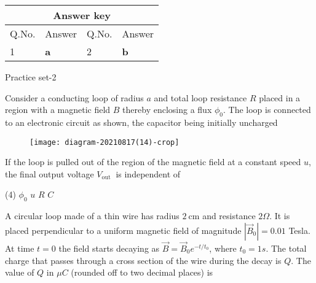\setlength\arrayrulewidth{1pt}
\begin{table}[H]
	\centering
	
	\begin{tabular}{|p{1.5cm}|p{1.5cm}||p{1.5cm}|p{1.5cm}|}
		\hline
		\multicolumn{4}{|c|}{\textbf{Answer key}}\\\hline\hline
		\rowcolor{ocrel}Q.No.&Answer&Q.No.&Answer\\\hline
		1&\textbf{a}&2&\textbf{b}\\\hline
	\end{tabular}
\end{table}
\newpage
\begin{abox}
	Practice set-2
	\end{abox}
\begin{enumerate}
	\begin{minipage}{\textwidth}
		\item Consider a conducting loop of radius $a$ and total loop resistance $R$ placed in a region with a magnetic field $B$ thereby enclosing a flux $\phi_{0}$. The loop is connected to an electronic circuit as shown, the capacitor being initially uncharged\\
		\begin{figure}[H]
			\centering
			\texttt{[image: diagram-20210817(14)-crop]}
		\end{figure}
		If the loop is pulled out of the region of the magnetic field at a constant speed $u$, the final output voltage $V_{\text {out }}$ is independent of
	\end{minipage}
	\begin{tasks}(4)
		\task[\textbf{A.}] $\phi_{0}$
		\task[\textbf{B.}]$u$ 
		\task[\textbf{C.}]$R$
		\task[\textbf{D.}] $C$ 
	\end{tasks}
\begin{minipage}{\textwidth}
	\item A circular loop made of a thin wire has radius $2 \mathrm{~cm}$ and resistance $2 \Omega$. It is placed perpendicular to a uniform magnetic field of magnitude $\left|\vec{B}_{0}\right|=0.01$ Tesla. At time $t=0$ the field starts decaying as $\vec{B}=\vec{B}_{0} e^{-t / t_{0}}$, where $t_{0}=1 s .$ The total charge that passes through a cross section of the wire during the decay is $Q$. The value of $Q$ in $\mu C$ (rounded off to two decimal places) is
\end{minipage}
\begin{minipage}{\textwidth}

\end{minipage}
\end{enumerate}
